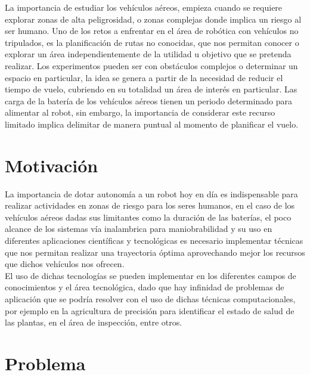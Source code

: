\documentclass[]{report}
\begin{document}
La importancia de estudiar los vehículos aéreos, empieza cuando se requiere explorar zonas de alta peligrosidad, o zonas complejas donde implica un riesgo al ser humano.
Uno de los retos a enfrentar en el área de robótica con vehículos no tripulados, es la planificación de rutas no conocidas, que nos permitan conocer o explorar un área independientemente de la utilidad u objetivo que se pretenda realizar. Los experimentos pueden ser con obstáculos complejos o determinar un espacio en particular, la idea se genera a partir de la necesidad de reducir el tiempo de vuelo, cubriendo en su totalidad un área de interés en particular.
Las carga de la batería de los vehículos aéreos tienen un periodo determinado para alimentar al robot, sin embargo, la importancia de considerar este recurso limitado implica delimitar de manera puntual al momento de planificar el vuelo.
\section{Motivación}
La importancia de dotar autonomía a un robot hoy en día es indispensable para realizar actividades en zonas de riesgo para los seres humanos, en el caso de los vehículos aéreos dadas sus limitantes como la duración de las baterías, el poco alcance de los sistemas vía inalambrica para maniobrabilidad y su uso en diferentes aplicaciones científicas y tecnológicas es necesario implementar técnicas que nos permitan realizar una trayectoria óptima aprovechando mejor los recursos que dichos vehículos nos ofrecen.\\
El uso de dichas tecnologías se pueden implementar en los diferentes campos de conocimientos y el área tecnológica, dado que hay infinidad de  problemas de aplicación que se podría resolver con el uso de dichas técnicas computacionales, por ejemplo en la agricultura de precisión para identificar el estado de salud de las plantas, en el área de inspección, entre otros.


  


\section{Problema}
\end{document}
